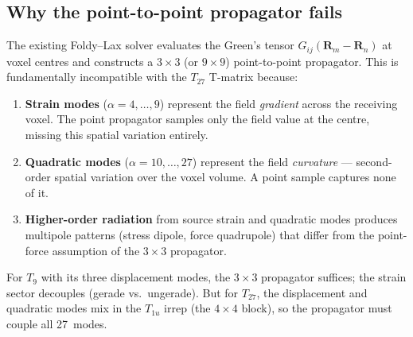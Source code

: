 \documentclass[11pt,a4paper]{article}
\newcommand{\bR}{\bm{R}}
\theoremstyle{plain}
\theoremstyle{definition}
\theoremstyle{remark}
\begin{document}
\subsection{Why the point-to-point propagator fails}
\label{sec:why-point-fails}

The existing Foldy--Lax solver evaluates the Green's tensor
$G_{ij}(\bR_m - \bR_n)$ at voxel centres and constructs a
$3 \times 3$ (or $9 \times 9$) point-to-point propagator.  This is
fundamentally incompatible with the $T_{27}$ T-matrix because:
\begin{enumerate}[nosep]
  \item \textbf{Strain modes} ($\alpha = 4,\ldots,9$) represent the
    field \emph{gradient} across the receiving voxel.  The point
    propagator samples only the field value at the centre, missing
    this spatial variation entirely.
  \item \textbf{Quadratic modes} ($\alpha = 10,\ldots,27$) represent
    the field \emph{curvature} --- second-order spatial variation over
    the voxel volume.  A point sample captures none of it.
  \item \textbf{Higher-order radiation} from source strain and
    quadratic modes produces multipole patterns (stress dipole,
    force quadrupole) that differ from the point-force assumption
    of the $3 \times 3$ propagator.
\end{enumerate}
For $T_9$ with its three displacement modes, the $3 \times 3$
propagator suffices; the strain sector decouples (gerade vs.\
ungerade).  But for $T_{27}$, the displacement and quadratic modes
mix in the $T_{1u}$ irrep (the $4 \times 4$ block), so the
propagator must couple all 27~modes.
\end{document}
